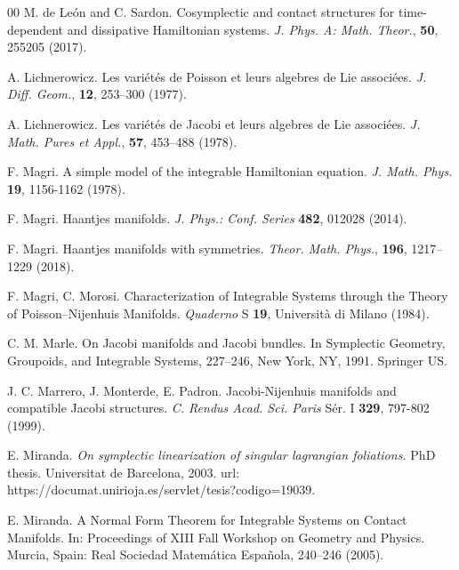 \documentclass[10pt]{amsart}
\numberwithin{equation}{section}
\newcommand{\tbf}{\textbf}
\theoremstyle{definition}
\begin{document}
\begin{thebibliography}{00}
 M. de Le\'on and C. Sardon. Cosymplectic and contact structures for time-dependent and dissipative Hamiltonian systems. \textit{J. Phys. A: Math. Theor.}, \tbf{50}, 255205 (2017).

 A. Lichnerowicz. Les vari\'et\'es de Poisson et leurs algebres de Lie associ\'ees. \textit{J. Diff. Geom.}, \tbf{12}, 253–300 (1977).

 A. Lichnerowicz. Les vari\'et\'es de Jacobi et leurs algebres de Lie associ\'ees. \textit{J. Math. Pures et Appl.}, \tbf{57}, 453–488 (1978).

 F. Magri. A simple model of the integrable Hamiltonian equation. \textit{J. Math. Phys.} \textbf{19}, 1156-1162 (1978).

 F. Magri. Haantjes manifolds. \textit{J. Phys.: Conf. Series} \textbf{482}, 012028 (2014).


 F. Magri. Haantjes manifolds with symmetries.  \textit{Theor. Math. Phys.}, \textbf{196}, 1217--1229 (2018).

 F. Magri, C. Morosi. Characterization of Integrable Systems through the Theory of Poisson--Nijenhuis Manifolds.  \textit{Quaderno}  S \textbf{19}, Universit\`a di Milano (1984).

 C. M. Marle. On Jacobi manifolds and Jacobi bundles. In Symplectic Geometry, Groupoids, and Integrable Systems, 227–246, New York, NY, 1991. Springer US.

 J. C. Marrero, J. Monterde, E. Padron. Jacobi-Nijenhuis manifolds and compatible Jacobi structures. \textit{C. Rendus Acad. Sci. Paris} S\'er. I \tbf{329}, 797-802 (1999).



 E. Miranda. \textit{On symplectic linearization of singular lagrangian foliations.} PhD thesis.
Universitat de Barcelona, 2003. url: https://documat.unirioja.es/servlet/tesis?codigo=19039.

 E. Miranda. A Normal Form Theorem for Integrable Systems on Contact Manifolds. In: Proceedings of XIII Fall Workshop on Geometry and Physics. Murcia, Spain: Real Sociedad Matemática Española, 240–246 (2005). 


\end{thebibliography}
\end{document}
